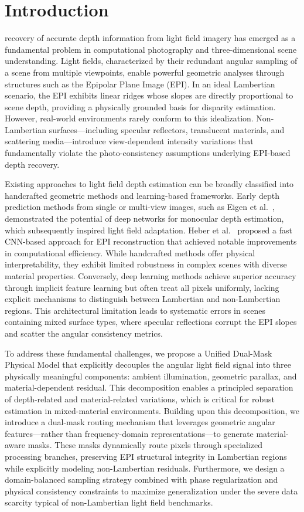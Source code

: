 \documentclass[lettersize,journal]{IEEEtran}
\begin{document}
\section{Introduction}

 recovery of accurate depth information from light field imagery has emerged as a fundamental problem in computational photography and three-dimensional scene understanding. Light fields, characterized by their redundant angular sampling of a scene from multiple viewpoints, enable powerful geometric analyses through structures such as the Epipolar Plane Image (EPI). In an ideal Lambertian scenario, the EPI exhibits linear ridges whose slopes are directly proportional to scene depth, providing a physically grounded basis for disparity estimation. However, real-world environments rarely conform to this idealization. Non-Lambertian surfaces---including specular reflectors, translucent materials, and scattering media---introduce view-dependent intensity variations that fundamentally violate the photo-consistency assumptions underlying EPI-based depth recovery.

Existing approaches to light field depth estimation can be broadly classified into handcrafted geometric methods and learning-based frameworks. Early depth prediction methods from single or multi-view images, such as Eigen et al.~\cite{eigen2014}, demonstrated the potential of deep networks for monocular depth estimation, which subsequently inspired light field adaptation. Heber et al.~\cite{heber2018} proposed a fast CNN-based approach for EPI reconstruction that achieved notable improvements in computational efficiency. While handcrafted methods offer physical interpretability, they exhibit limited robustness in complex scenes with diverse material properties. Conversely, deep learning methods achieve superior accuracy through implicit feature learning but often treat all pixels uniformly, lacking explicit mechanisms to distinguish between Lambertian and non-Lambertian regions. This architectural limitation leads to systematic errors in scenes containing mixed surface types, where specular reflections corrupt the EPI slopes and scatter the angular consistency metrics.

To address these fundamental challenges, we propose a Unified Dual-Mask Physical Model that explicitly decouples the angular light field signal into three physically meaningful components: ambient illumination, geometric parallax, and material-dependent residual. This decomposition enables a principled separation of depth-related and material-related variations, which is critical for robust estimation in mixed-material environments. Building upon this decomposition, we introduce a dual-mask routing mechanism that leverages geometric angular features---rather than frequency-domain representations---to generate material-aware masks. These masks dynamically route pixels through specialized processing branches, preserving EPI structural integrity in Lambertian regions while explicitly modeling non-Lambertian residuals. Furthermore, we design a domain-balanced sampling strategy combined with phase regularization and physical consistency constraints to maximize generalization under the severe data scarcity typical of non-Lambertian light field benchmarks.
\end{document}
